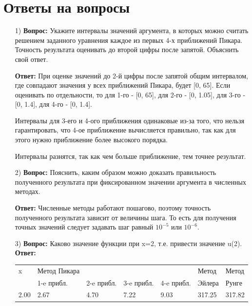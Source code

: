 \documentclass[14pt, a4paper]{extarticle}
\begin{document}
	\section*{Ответы на вопросы}
	\begin{enumerate}
		\item[1)] \textbf{Вопрос:} Укажите интервалы значений аргумента, в которых можно считать решением заданного уравнения каждое из первых 4-х приближений Пикара. Точность результата оценивать до
		второй цифры после запятой. Объяснить свой ответ.
			
		\textbf{Ответ:} При оценке значений до 2-й цифры после запятой общим интервалом, где совпадают значения у всех приближений Пикара, будет [0, 65]. Если оценивать по отдельности, то для 1-го - [0, 65], 
		для 2-го - [0, 1.05], для 3-го - [0, 1.4], для 4-го - [0, 1.4].
			
		Интервалы для 3-его и 4-ого приближения одинаковые из-за того, что
		нельзя гарантировать, что 4-ое приближение вычисляется правильно, так как для этого
		нужно приближение более высокого порядка.
		
		Интервалы разнятся, так как чем больше приближение, тем точнее результат.
		
		\item[2)] \textbf{Вопрос:} Пояснить, каким образом можно доказать правильность полученного результата при
		фиксированном значении аргумента в численных методах.
		
		\textbf{Ответ:} Численные методы работают пошагово, поэтому точность полученного результата зависит от величины шага. То есть для получения точных значений следует задавать шаг равный $10^{-5}$ или $10^{-6}$.
		
		\newpage
		\item[3)] \textbf{Вопрос:} Каково значение функции при x=2, т.е. привести значение u(2).
		\textbf{Ответ:} 
		\par
		\begin{table}[h]
			\begin{tabular}{|l|l|l|l|l|l|l|}\hline
				x    & Метод Пикара    &       &        &        & Метод  & Метод \\
				& 1-e прибл. & 2-e прибл. & 3-e прибл. & 4-e прибл. & Эйлера  & Рунге \\ \hline
				2.00 & 2.67   & 4.70    & 7.22  & 9.03  & 317.25  & 317.82 \\
				\hline     
			\end{tabular}
		\end{table}
	\end{enumerate}
	
\end{document}
